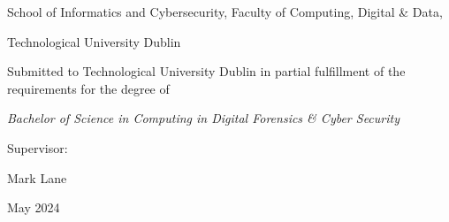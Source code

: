 \documentclass[../main.tex]{subfiles}
\begin{document}
\begin{titlepage}
\begin{center}
        School of Informatics and Cybersecurity, Faculty of Computing, Digital \& Data,

        Technological University Dublin

        \vfill

        Submitted to Technological University Dublin in partial fulfillment of the requirements for the degree of

        \textit {
            Bachelor of Science in Computing in Digital Forensics \& Cyber Security
        }

        \vfill

		\fontsize{12}{12} 
		\selectfont

		Supervisor:


		Mark Lane

        \vfill

        May 2024


	\end{center}


\end{titlepage}
\end{document}
